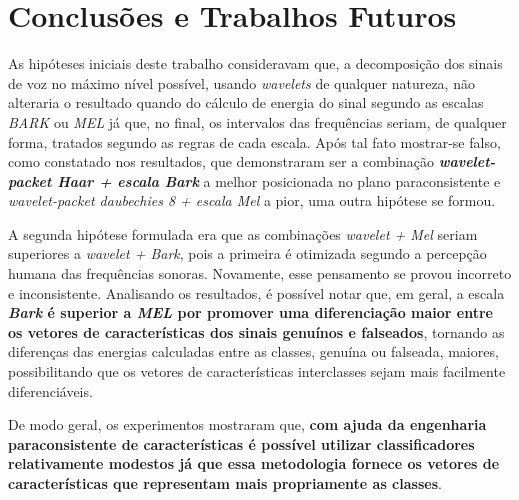 \chapter{Conclusões e Trabalhos Futuros} \label{chap:conclusions}
	\par As hipóteses iniciais deste trabalho consideravam que, a decomposição dos sinais de voz no máximo nível possível, usando \textit{wavelets} de qualquer natureza, não alteraria o resultado quando do cálculo de energia do sinal segundo as escalas \textit{BARK} ou \textit{MEL} já que, no final, os intervalos das frequências seriam, de qualquer forma, tratados segundo as regras de cada escala. Após tal fato mostrar-se falso, como constatado nos resultados, que demonstraram ser a combinação \textbf{\textit{wavelet-packet Haar + escala Bark}} a melhor posicionada no plano paraconsistente e \textit{wavelet-packet daubechies 8 + escala Mel} a pior, uma outra hipótese se formou.
	
	\par A segunda hipótese formulada era que as combinações \textit{wavelet + Mel} seriam superiores a \textit{wavelet + Bark}, pois a primeira é otimizada segundo a percepção humana das frequências sonoras. Novamente, esse pensamento se provou incorreto e inconsistente. Analisando os resultados, é possível notar que, em geral, a escala \textbf{\textit{Bark} é superior a \textit{MEL} por promover uma diferenciação maior entre os vetores de características dos sinais genuínos e falseados}, tornando as diferenças das energias calculadas entre as classes, genuína ou falseada, maiores, possibilitando que os vetores de características interclasses sejam mais facilmente diferenciáveis.

    \par De modo geral, os experimentos mostraram que, \textbf{com ajuda da engenharia paraconsistente de características é possível utilizar classificadores relativamente modestos já que essa metodologia fornece os vetores de características que representam mais propriamente as classes}.
    
    
